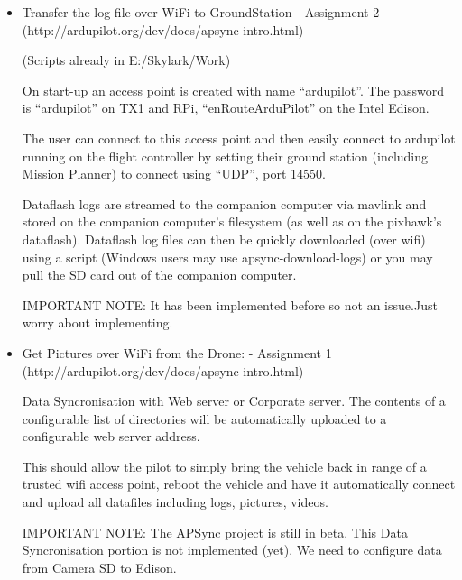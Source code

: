 \documentclass[12pt]{report}
\begin{document}
\begin{itemize}

\item Transfer the log file over WiFi to GroundStation                  -              Assignment 2 \\(http://ardupilot.org/dev/docs/apsync-intro.html)

(Scripts already in E:/Skylark/Work)

On start-up an access point is created with name “ardupilot”. The password is “ardupilot” on TX1 and RPi, “enRouteArduPilot” on the Intel Edison.

The user can connect to this access point and then easily connect to ardupilot running on the flight controller by setting their ground station
 (including Mission Planner) to connect using “UDP”, port 14550.

Dataflash logs are streamed to the companion computer via mavlink and stored on the companion computer’s filesystem (as well as on the pixhawk’s dataflash).
 Dataflash log files can then be quickly downloaded (over wifi) using a script (Windows users may use apsync-download-logs) or you may pull the SD card out
 of the companion computer.

IMPORTANT NOTE: It has been implemented before so not an issue.Just worry about implementing.

\item Get Pictures over WiFi from the Drone:                           -               Assignment 1 \\(http://ardupilot.org/dev/docs/apsync-intro.html)

Data Syncronisation with Web server or Corporate server.
The contents of a configurable list of directories will be automatically uploaded to a configurable web server address.

This should allow the pilot to simply bring the vehicle back in range of a trusted wifi access point, reboot the vehicle and have it 
automatically connect and upload all datafiles including logs, pictures, videos.

IMPORTANT NOTE: The APSync project is still in beta. This Data Syncronisation portion is not implemented (yet). We need to configure data from Camera SD to Edison.




\end{itemize}
\end{document}
